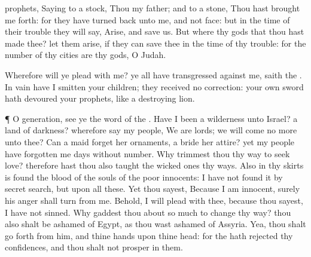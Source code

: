 {prophets,
Saying to a
stock, Thou
{} my
father; and to a
stone, Thou hast brought me
forth: for they have
turned
{}
back unto me, and not
{}
face: but in the
time of their
trouble they will
say,
Arise, and
save us.
But where
{} thy
gods that thou hast
made thee? let them
arise, if they can
save thee in the
time of thy
trouble: for
{} the
number of thy
cities are thy
gods, O
Judah.
\par }{\PP {}Wherefore will ye
plead with me? ye all have
transgressed against me,
saith the
{}.
In
vain have I
smitten your
children; they
received no
correction: your own
sword hath
devoured your
prophets, like a
destroying
lion.
\par }{\PP {}¶ O
generation,
see ye the
word of the
{}. Have I been a
wilderness unto
Israel? a
land of
darkness? wherefore
say my
people, We are
lords; we will
come no more unto thee?
Can a
maid
forget her
ornaments,
{} a
bride her
attire? yet my
people have
forgotten me
days without
number.
Why
trimmest thou thy
way to
seek
love? therefore hast thou also
taught the wicked
ones thy
ways.
Also in thy
skirts is
found the
blood of the
souls of the
poor
innocents: I have not
found it by secret
search, but upon all these.
Yet thou
sayest, Because I am
innocent, surely his
anger shall
turn from me. Behold, I will
plead with thee, because thou
sayest, I have not
sinned.
Why gaddest thou
about so
much to
change thy
way? thou also shalt be
ashamed of
Egypt, as thou wast
ashamed of
Assyria.
Yea, thou shalt go
forth from him, and thine
hands upon thine
head: for the
{} hath
rejected thy
confidences, and thou shalt not
prosper in them.

}
